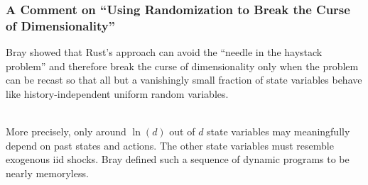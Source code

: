 \documentclass{beamer}
\begin{document}
\begin{frame}[fragile]
\frametitle{A Comment on ``Using Randomization to Break the Curse of Dimensionality''}

Bray showed that Rust's approach can avoid the ``needle in the haystack problem'' and therefore break the curse of dimensionality only when the problem can be recast so that all but a vanishingly small fraction of state variables behave like history-independent uniform random variables. \\~\

More precisely, only around $\ln(d)$ out of $d$ state variables may meaningfully depend on past states and actions. The other state variables must resemble exogenous iid shocks. Bray defined such a sequence of dynamic programs to be nearly memoryless.
\end{frame}
\end{document}
